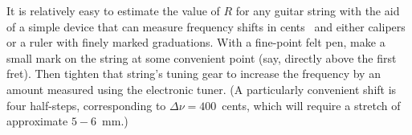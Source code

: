 It is relatively easy to estimate the value of $R$ for any guitar string with the aid of a simple device that can measure frequency shifts in cents~\cite{ref:pgtweb} and either calipers or a ruler with finely marked graduations. With a fine-point felt pen, make a small mark on the string at some convenient point (say, directly above the first fret). Then tighten that string's tuning gear to increase the frequency by an amount measured using the electronic tuner. (A particularly convenient shift is four half-steps, corresponding to $\Delta \nu = 400$~cents, which will require a stretch of approximate $5 - 6$~mm.) 

%
%
%
